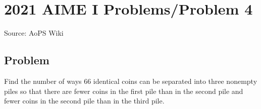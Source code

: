 \documentclass[12pt]{article}
\begin{document}
\section*{{2021 AIME I Problems/Problem 4}}
Source: AoPS Wiki

\subsection*{Problem}
Find the number of ways $66$ identical coins can be separated into three nonempty piles so that there are fewer coins in the first pile than in the second pile and fewer coins in the second pile than in the third pile.
\end{document}
